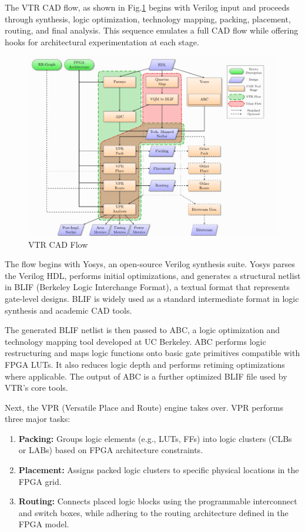 The VTR CAD flow, as shown in Fig.\ref{fig:vtr cad flow} begins with Verilog input and proceeds through synthesis, logic optimization, technology mapping, packing, placement, routing, and final analysis. This sequence emulates a full CAD flow while offering hooks for architectural experimentation at each stage.

\begin{figure}
	\centerline{\includegraphics[scale = 0.8125]{Figures/vtr_cad_flow.png}}
	\caption{VTR CAD Flow\cite{vtr-toolchain-1}}
	\label{fig:vtr cad flow}
\end{figure}

The flow begins with Yosys, an open-source Verilog synthesis suite\cite{vtr-toolchain-2}. Yosys parses the Verilog HDL, performs initial optimizations, and generates a structural netlist in BLIF (Berkeley Logic Interchange Format), a textual format that represents gate-level designs. BLIF is widely used as a standard intermediate format in logic synthesis and academic CAD tools.

The generated BLIF netlist is then passed to ABC, a logic optimization and technology mapping tool developed at UC Berkeley\cite{vtr-toolchain-3}. ABC performs logic restructuring and maps logic functions onto basic gate primitives compatible with FPGA LUTs\cite{vtr-toolchain-4}. It also reduces logic depth and performs retiming optimizations where applicable. The output of ABC is a further optimized BLIF file used by VTR's core tools.

Next, the VPR (Versatile Place and Route) engine takes over. VPR performs three major tasks:
\begin{enumerate}
	\item \textbf{Packing:} Groups logic elements (e.g., LUTs, FFs) into logic clusters (CLBs or LABs) based on FPGA architecture constraints.
	\item \textbf{Placement:} Assigns packed logic clusters to specific physical locations in the FPGA grid.
	\item \textbf{Routing:} Connects placed logic blocks using the programmable interconnect and switch boxes, while adhering to the routing architecture defined in the FPGA model.
\end{enumerate}

